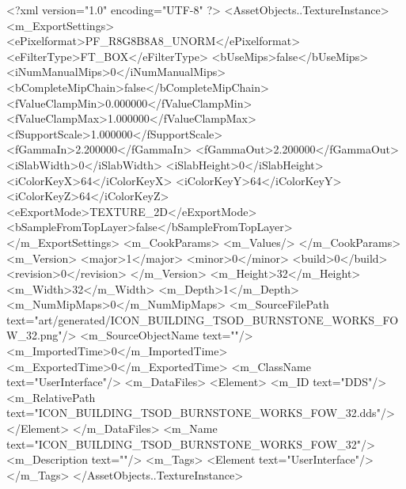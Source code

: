 <?xml version="1.0" encoding="UTF-8" ?>
<AssetObjects..TextureInstance>
	<m_ExportSettings>
		<ePixelformat>PF_R8G8B8A8_UNORM</ePixelformat>
		<eFilterType>FT_BOX</eFilterType>
		<bUseMips>false</bUseMips>
		<iNumManualMips>0</iNumManualMips>
		<bCompleteMipChain>false</bCompleteMipChain>
		<fValueClampMin>0.000000</fValueClampMin>
		<fValueClampMax>1.000000</fValueClampMax>
		<fSupportScale>1.000000</fSupportScale>
		<fGammaIn>2.200000</fGammaIn>
		<fGammaOut>2.200000</fGammaOut>
		<iSlabWidth>0</iSlabWidth>
		<iSlabHeight>0</iSlabHeight>
		<iColorKeyX>64</iColorKeyX>
		<iColorKeyY>64</iColorKeyY>
		<iColorKeyZ>64</iColorKeyZ>
		<eExportMode>TEXTURE_2D</eExportMode>
		<bSampleFromTopLayer>false</bSampleFromTopLayer>
	</m_ExportSettings>
	<m_CookParams>
		<m_Values/>
	</m_CookParams>
	<m_Version>
		<major>1</major>
		<minor>0</minor>
		<build>0</build>
		<revision>0</revision>
	</m_Version>
	<m_Height>32</m_Height>
	<m_Width>32</m_Width>
	<m_Depth>1</m_Depth>
	<m_NumMipMaps>0</m_NumMipMaps>
	<m_SourceFilePath text="art/generated/ICON_BUILDING_TSOD_BURNSTONE_WORKS_FOW_32.png"/>
	<m_SourceObjectName text=""/>
	<m_ImportedTime>0</m_ImportedTime>
	<m_ExportedTime>0</m_ExportedTime>
	<m_ClassName text="UserInterface"/>
	<m_DataFiles>
		<Element>
			<m_ID text="DDS"/>
			<m_RelativePath text="ICON_BUILDING_TSOD_BURNSTONE_WORKS_FOW_32.dds"/>
		</Element>
	</m_DataFiles>
	<m_Name text="ICON_BUILDING_TSOD_BURNSTONE_WORKS_FOW_32"/>
	<m_Description text=""/>
	<m_Tags>
		<Element text="UserInterface"/>
	</m_Tags>
</AssetObjects..TextureInstance>
